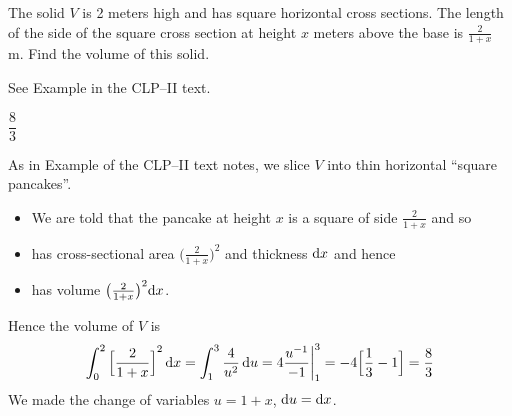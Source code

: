 \begin{solution}
\end{solution}


\begin{Mquestion}[1997D] %
The solid $V$ is 2 meters high and has square horizontal
cross sections. The length of the side of the square cross section at height
$x$ meters above the base is $\frac{2}{1+x}$ m. Find the volume
of this solid.
\end{Mquestion}

\begin{hint}
See Example  in the
CLP--II text.
\end{hint}

\begin{answer}
$\dfrac{8}{3}$
\end{answer}

\begin{solution}
As in Example  of the
CLP--II text notes, we slice $V$  into thin horizontal ``square pancakes''.

\begin{itemize}
\item We are told that the pancake at height $x$ is a square
of side $\frac{2}{1+x}$ and so
\item has cross-sectional area $\big(\frac{2}{1+x}\big)^2$ and
thickness $\mathrm{d}x$ and hence
\item has volume $\big(\frac{2}{1+x}\big)^2\mathrm{d}x$.
\end{itemize}
\noindent Hence the volume of $V$ is
$$
\int_0^2{\Big[\frac{2}{1+x}\Big]}^2\,\mathrm{d}x
=\int_1^3\frac{4}{u^2}\,\mathrm{d}u
=4\frac{u^{-1}}{-1}\bigg|_1^3
=-4\Big[\frac{1}{3}-1\Big]
=\frac{8}{3}
$$
We made the change of variables $u=1+x$, $\mathrm{d}u=\mathrm{d}x$.
\end{solution}

